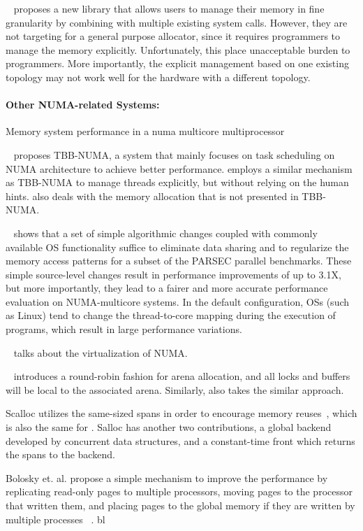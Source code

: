 ~\cite{cantalupo2015memkind} proposes a new library that allows users to manage their memory in fine granularity by combining with multiple existing system calls. However, they are not targeting for a general purpose allocator, since it requires programmers to manage the memory explicitly. Unfortunately, this place unacceptable burden to programmers. More importantly, the explicit management based on one existing topology may not work well for the hardware with a different topology. 



\paragraph{Other NUMA-related Systems:} 

Memory system performance in a numa multicore multiprocessor

~\cite{Majo:2015:LPC:2688500.2688509} proposes TBB-NUMA, a system that mainly focuses on task scheduling on NUMA architecture to achieve better performance. \NM{} employs a similar mechanism as TBB-NUMA to manage threads explicitly, but without relying on the human hints. \NM{} also deals with the memory allocation that is not presented in TBB-NUMA. 

~\cite{6704666} shows that a set of simple algorithmic changes coupled with commonly available OS functionality suffice to eliminate data sharing and to regularize the memory access patterns for a subset of the PARSEC parallel benchmarks. These simple source-level changes result in performance improvements of up to 3.1X, but more importantly, they lead to a fairer and more accurate performance evaluation on NUMA-multicore systems. In the default
configuration, OSs (such as Linux) tend to change the thread-to-core mapping during the execution of programs, which result in large performance variations.

~\cite{Bui:2019:EPV:3302424.3303960} talks about the virtualization of NUMA.

~\cite{jemalloc} introduces a round-robin fashion for arena allocation, and all locks and buffers will be local to the associated arena. Similarly, \NM{} also takes the similar approach. 

Scalloc utilizes the same-sized spans in order to encourage memory reuses~\cite{Scalloc}, which is also the same for \NM{}. Salloc has another two contributions, a global backend developed by concurrent data structures, and a constant-time front which returns the spans to the backend. 

Bolosky et. al. propose a simple mechanism to improve the performance by replicating read-only pages to multiple processors, moving pages to the processor that written them, and placing pages to the global memory if they are written by multiple processes ~\cite{Bolosky:1989:SBE:74850.74854}. bl

